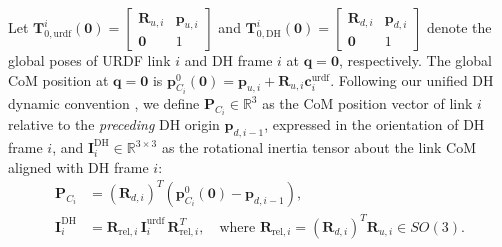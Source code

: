 \documentclass[fleqn,10pt]{article}
\begin{document}
	Let $\bm{T}_{0,\text{urdf}}^i(\bm{0}) = \begin{bmatrix} \bm{R}_{u,i} & \bm{p}_{u,i} \\ \bm{0} & 1 \end{bmatrix}$ and $\bm{T}_{0,\text{DH}}^i(\bm{0}) = \begin{bmatrix} \bm{R}_{d,i} & \bm{p}_{d,i} \\ \bm{0} & 1 \end{bmatrix}$ denote the global poses of URDF link $i$ and DH frame $i$ at $\bm{q} = \bm{0}$, respectively. The global CoM position at $\bm{q}=\bm{0}$ is $\bm{p}_{C_i}^0(\bm{0}) = \bm{p}_{u,i} + \bm{R}_{u,i}\bm{c}_i^{\text{urdf}}$. Following our unified DH dynamic convention \cite{ihab2026urdf2dt, asr2026calibration}, we define $\bm{P}_{C_i} \in \mathbb{R}^3$ as the CoM position vector of link $i$ relative to the \textit{preceding} DH origin $\bm{p}_{d,i-1}$, expressed in the orientation of DH frame $i$, and $\bm{I}_i^{\text{DH}} \in \mathbb{R}^{3 \times 3}$ as the rotational inertia tensor about the link CoM aligned with DH frame $i$:
	\begin{align}
		\bm{P}_{C_i} &= \left(\bm{R}_{d,i}\right)^T \left( \bm{p}_{C_i}^0(\bm{0}) - \bm{p}_{d,i-1} \right), \label{eq:com_dh_map} \\
		\bm{I}_i^{\text{DH}} &= \bm{R}_{\text{rel},i} \, \bm{I}_i^{\text{urdf}} \, \bm{R}_{\text{rel},i}^T, \quad \text{where } \bm{R}_{\text{rel},i} = \left(\bm{R}_{d,i}\right)^T \bm{R}_{u,i} \in SO(3). \label{eq:inertia_dh_map}
	\end{align}
	
\end{document}
